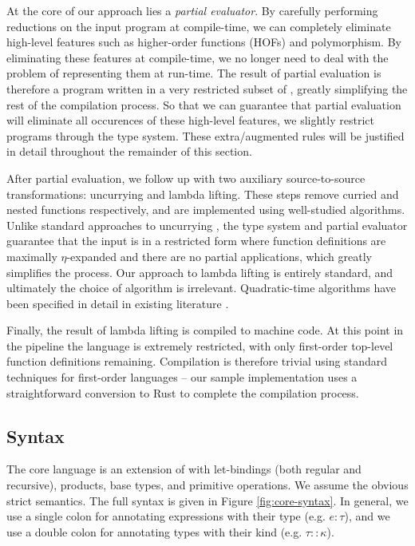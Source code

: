 \documentclass[runningheads]{llncs}
\begin{document}
At the core of our approach lies a \emph{partial evaluator}. By carefully performing reductions on the input program at compile-time, we can completely eliminate high-level features such as higher-order functions (HOFs) and polymorphism. By eliminating these features at compile-time, we no longer need to deal with the problem of representing them at run-time. The result of partial evaluation is therefore a program written in a very restricted subset of \core{}, greatly simplifying the rest of the compilation process. So that we can guarantee that partial evaluation will eliminate all occurences of these high-level features, we slightly restrict \core{} programs through the type system. These extra/augmented rules will be justified in detail throughout the remainder of this section.

After partial evaluation, we follow up with two auxiliary source-to-source transformations: uncurrying and lambda lifting. These steps remove curried and nested functions respectively, and are implemented using well-studied algorithms. Unlike standard approaches to uncurrying \cite{hannan1998higher}, the type system and partial evaluator guarantee that the input is in a restricted form where function definitions are maximally $\eta$-expanded and there are no partial applications, which greatly simplifies the process. Our approach to lambda lifting is entirely standard, and ultimately the choice of algorithm is irrelevant. Quadratic-time algorithms have been specified in detail in existing literature \cite{morazan2008optimal}.

Finally, the result of lambda lifting is compiled to machine code. At this point in the pipeline the language is extremely restricted, with only first-order top-level function definitions remaining. Compilation is therefore trivial using standard techniques for first-order languages -- our sample implementation uses a straightforward conversion to Rust \cite{klabnik2023rust} to complete the compilation process.

\subsection{Syntax}

The core language \core{} is an extension of \fom{} with let-bindings (both regular and recursive), products, base types, and primitive operations. We assume the obvious strict semantics. The full syntax is given in Figure \ref{fig:core-syntax}. In general, we use a single colon for annotating expressions with their type (e.g. $e : \tau$), and we use a double colon for annotating types with their kind (e.g. $\tau :: \kappa$).
\end{document}
